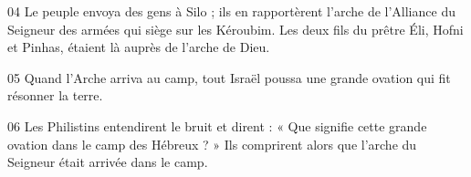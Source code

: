 
04 Le peuple envoya des gens à Silo ; ils en rapportèrent l’arche de l’Alliance du Seigneur des armées qui siège sur les Kéroubim. Les deux fils du prêtre Éli, Hofni et Pinhas, étaient là auprès de l’arche de Dieu.

05 Quand l’Arche arriva au camp, tout Israël poussa une grande ovation qui fit résonner la terre.

06 Les Philistins entendirent le bruit et dirent : « Que signifie cette grande ovation dans le camp des Hébreux ? » Ils comprirent alors que l’arche du Seigneur était arrivée dans le camp.
